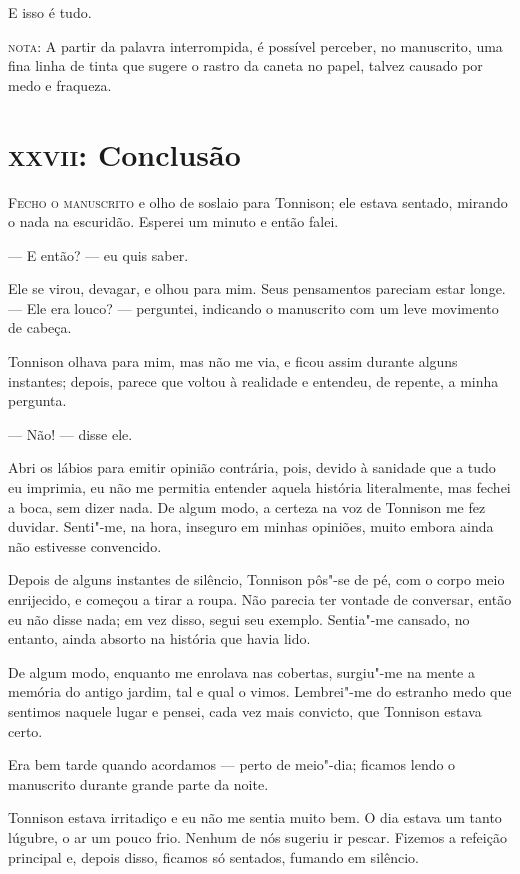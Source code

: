 \smallskip

E isso é tudo.

\smallskip

\textsc{nota}: A partir da palavra interrompida, é possível perceber, no manuscrito, uma fina linha de tinta que sugere o rastro
da caneta no papel, talvez causado por medo e fraqueza.


\clearpage

\chapter{\textsc{xxvii}: Conclusão}

\textsc{Fecho o manuscrito} e olho de soslaio para Tonnison; ele estava sentado, mirando o nada na escuridão. Esperei um
minuto e então falei.

--- E então? --- eu quis saber.

Ele se virou, devagar, e olhou para mim. Seus pensamentos pareciam estar longe. --- Ele era louco? --- perguntei, indicando o
manuscrito com um leve movimento de cabeça.

Tonnison olhava para mim, mas não me via, e ficou assim durante alguns instantes; depois, parece que voltou à realidade e
entendeu, de repente, a minha pergunta.

--- Não! --- disse ele.

Abri os lábios para emitir opinião contrária, pois, devido à sanidade que a tudo eu imprimia, eu não me permitia
entender aquela história literalmente, mas fechei a boca, sem dizer nada. De algum modo, a certeza na voz de Tonnison
me fez duvidar. Senti"-me, na hora, inseguro em minhas opiniões, muito embora ainda não estivesse convencido.

Depois de alguns instantes de silêncio, Tonnison pôs"-se de pé, com o corpo meio enrijecido, e começou a tirar a roupa.
Não parecia ter vontade de conversar, então eu não disse nada; em vez disso, segui seu exemplo. Sentia"-me cansado, no
entanto, ainda absorto na história que havia lido.

De algum modo, enquanto me enrolava nas cobertas, surgiu"-me na mente a memória do antigo jardim, tal e qual o vimos.
Lembrei"-me do estranho medo que sentimos naquele lugar e pensei, cada vez mais convicto, que Tonnison estava
certo.

Era bem tarde quando acordamos --- perto de meio"-dia; ficamos lendo o manuscrito durante grande parte da noite.

Tonnison estava irritadiço e eu não me sentia muito bem. O dia estava um tanto lúgubre, o ar um pouco frio. Nenhum de
nós sugeriu ir pescar. Fizemos a refeição principal e, depois disso, ficamos só sentados, fumando em silêncio.

